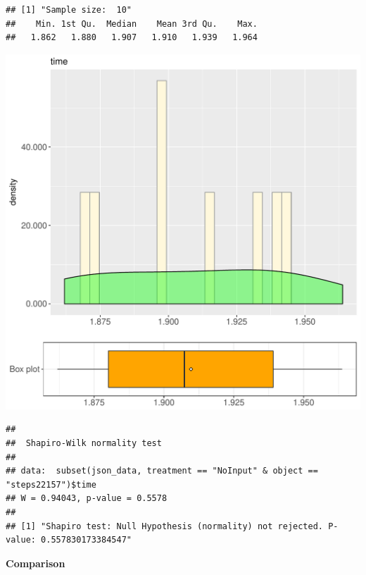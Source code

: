 \documentclass{article}\usepackage[]{graphicx}\usepackage[]{color}
\makeatletter
\def\maxwidth{ %
  \ifdim\Gin@nat@width>\linewidth
    \linewidth
  \else
    \Gin@nat@width
  \fi
}
\newenvironment{kframe}{%
 \def\at@end@of@kframe{}%
 \ifinner\ifhmode%
  \def\at@end@of@kframe{\end{minipage}}%
  \begin{minipage}{\columnwidth}%
 \fi\fi%
 \def\FrameCommand##1{\hskip\@totalleftmargin \hskip-\fboxsep
 \colorbox{shadecolor}{##1}\hskip-\fboxsep
     \hskip-\linewidth \hskip-\@totalleftmargin \hskip\columnwidth}%
 \MakeFramed {\advance\hsize-\width
   \@totalleftmargin\z@ \linewidth\hsize
   \@setminipage}}%
 {\par\unskip\endMakeFramed%
 \at@end@of@kframe}
\newenvironment{knitrout}{}{} %
\makeatother
\begin{document}
\begin{knitrout}
\color{fgcolor}\begin{kframe}
\begin{verbatim}
## [1] "Sample size:  10"
##    Min. 1st Qu.  Median    Mean 3rd Qu.    Max. 
##   1.862   1.880   1.907   1.910   1.939   1.964
\end{verbatim}
\end{kframe}
\includegraphics[width=\maxwidth]{figure/RH4_NoInput_steps22157-1} 
\begin{kframe}\begin{verbatim}
## 
## 	Shapiro-Wilk normality test
## 
## data:  subset(json_data, treatment == "NoInput" & object == "steps22157")$time
## W = 0.94043, p-value = 0.5578
## 
## [1] "Shapiro test: Null Hypothesis (normality) not rejected. P-value: 0.557830173384547"
\end{verbatim}
\end{kframe}
\end{knitrout}
  
 \textbf{Comparison}
  
\end{document}
